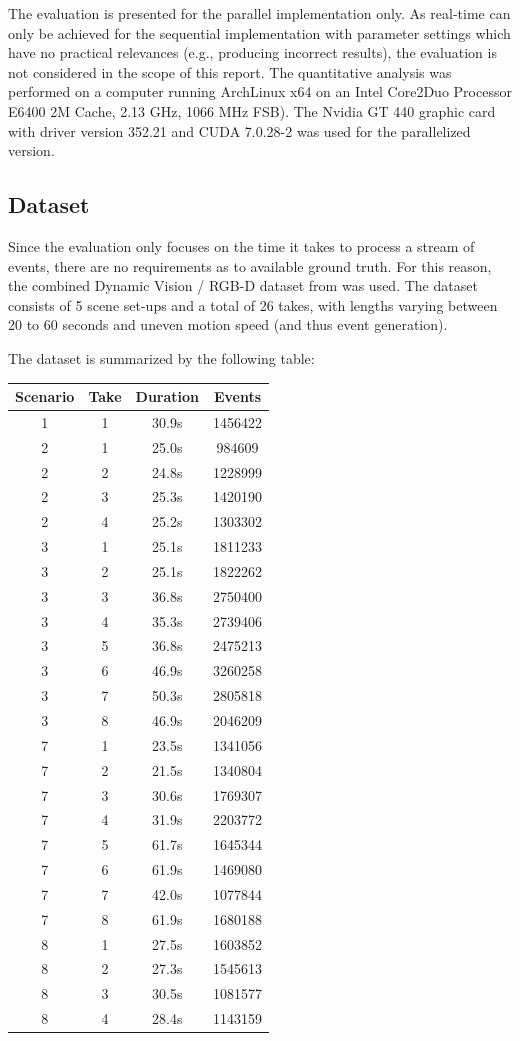 The evaluation is presented for the parallel implementation only.
As real-time can only be achieved for the sequential implementation with parameter settings which have no practical relevances (e.g., producing incorrect results), the evaluation is not considered in the scope of this report.
The quantitative analysis was performed on a computer running ArchLinux x64 on an Intel Core2Duo Processor E6400 2M Cache, 2.13 GHz, 1066 MHz FSB).
The Nvidia GT 440 graphic card with driver version 352.21 and CUDA 7.0.28-2 was used for the parallelized version.

\subsection{Dataset}
Since the evaluation only focuses on the time it takes to process a stream of events, there are no requirements as to available ground truth.
For this reason, the combined Dynamic Vision / RGB-D dataset from \cite{weikersdorfer2014event} was used.
The dataset consists of 5 scene set-ups and a total of 26 takes, with lengths varying between 20 to 60 seconds and uneven motion speed (and thus event generation).

The dataset is summarized by the following table:\\
\begin{center}
\begin{tabular}{ c  c  c  c  }
	Scenario & Take & Duration & Events\\
	\hline	
	\hline	
	1 & 1 & 30.9s & 1456422\\
	2 & 1 & 25.0s & 984609\\
	2 & 2 & 24.8s & 1228999\\
	2 & 3 & 25.3s & 1420190\\
	2 & 4 & 25.2s & 1303302\\
	3 & 1 & 25.1s & 1811233\\
	3 & 2 & 25.1s & 1822262\\
	3 & 3 & 36.8s & 2750400\\
	3 & 4 & 35.3s & 2739406\\
	3 & 5 & 36.8s & 2475213\\
	3 & 6 & 46.9s & 3260258\\
	3 & 7 & 50.3s & 2805818\\
	3 & 8 & 46.9s & 2046209\\
	7 & 1 & 23.5s & 1341056\\
	7 & 2 & 21.5s & 1340804\\
	7 & 3 & 30.6s & 1769307\\
	7 & 4 & 31.9s & 2203772\\
	7 & 5 & 61.7s & 1645344\\
	7 & 6 & 61.9s & 1469080\\
	7 & 7 & 42.0s & 1077844\\
	7 & 8 & 61.9s & 1680188\\
	8 & 1 & 27.5s & 1603852\\
	8 & 2 & 27.3s & 1545613\\
	8 & 3 & 30.5s & 1081577\\
	8 & 4 & 28.4s & 1143159\\                     
\end{tabular}
\end{center}


